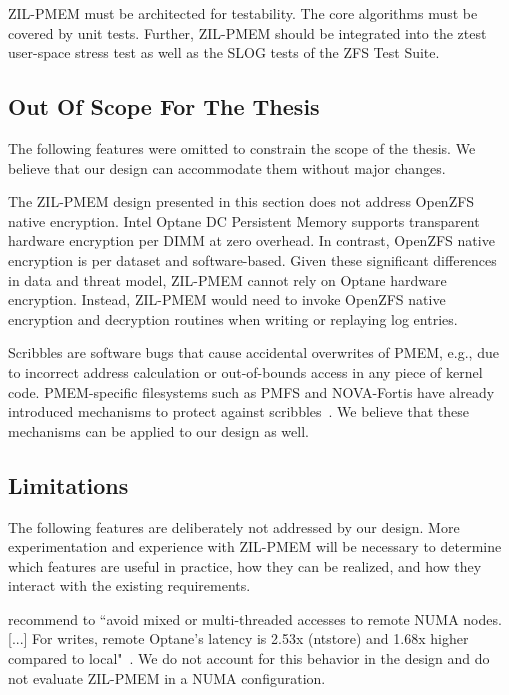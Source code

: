 \documentclass[12pt,a4paper,twoside]{book}
\begin{document}
ZIL-PMEM must be architected for testability.
The core algorithms must be covered by unit tests.
Further, ZIL-PMEM should be integrated into the ztest user-space stress test as well as the SLOG tests of the ZFS Test Suite.

\subsection{Out Of Scope For The Thesis}
The following features were omitted to constrain the scope of the thesis.
We believe that our design can accommodate them without major changes.

The ZIL-PMEM design presented in this section does not address OpenZFS native encryption.
Intel Optane DC Persistent Memory supports transparent hardware encryption per DIMM at zero overhead.
In contrast, OpenZFS native encryption is per dataset and software-based.
Given these significant differences in data and threat model, ZIL-PMEM cannot rely on Optane hardware encryption.
Instead, ZIL-PMEM would need to invoke OpenZFS native encryption and decryption routines when writing or replaying log entries.

Scribbles are software bugs that cause accidental overwrites of PMEM, e.g., due to incorrect address calculation or out-of-bounds access in any piece of kernel code.
PMEM-specific filesystems such as PMFS and NOVA-Fortis have already introduced mechanisms to protect against scribbles~\cite{dulloorSystemSoftwarePersistent2014,xuNOVAFortisFaulttolerantNonvolatile2017}.
We believe that these mechanisms can be applied to our design as well.

\subsection{Limitations}
The following features are deliberately not addressed by our design.
More experimentation and experience with ZIL-PMEM will be necessary to determine which features are useful in practice, how they can be realized, and how they interact with the existing requirements.

\citeauthor{yangEmpiricalGuideBehavior2020} recommend to ``avoid mixed or multi-threaded accesses to remote NUMA nodes. [...]  For writes, remote Optane’s latency is 2.53x (ntstore) and 1.68x higher compared to local"~\cite{yangEmpiricalGuideBehavior2020}.
We do not account for this behavior in the design and do not evaluate ZIL-PMEM in a NUMA configuration.
\end{document}
